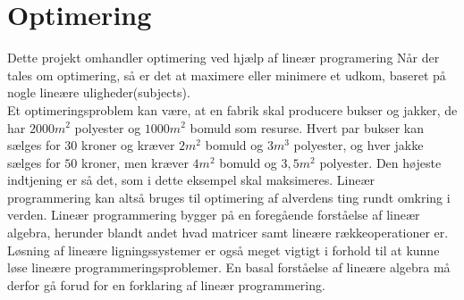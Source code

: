 
\section{Optimering}
Dette projekt omhandler optimering ved hjælp af lineær programering %
Når der tales om optimering, så er det at maximere eller minimere et udkom, baseret på nogle lineære uligheder(subjects). \\
Et optimeringsproblem kan være, at en fabrik skal producere bukser og jakker, de har $2000m^2$ polyester og $1000m^2$ bomuld som resurse.
Hvert par bukser kan sælges for $30$ kroner og kræver $2m^2$ bomuld og $3m^3$ polyester, og hver jakke sælges for $50$ kroner, men kræver $4m^2$ bomuld og $3,5m^2$ polyester. 
Den højeste indtjening er så det, som i dette eksempel skal maksimeres. 
Lineær programmering kan altså bruges til optimering af alverdens ting rundt omkring i verden.
Lineær programmering bygger på en foregående forståelse af lineær algebra, herunder blandt andet hvad matricer samt lineære rækkeoperationer er.
Løsning af lineære ligningssystemer er også meget vigtigt i forhold til at kunne løse lineære programmeringsproblemer.
En basal forståelse af lineære algebra må derfor gå forud for en forklaring af lineær programmering. 
\\

